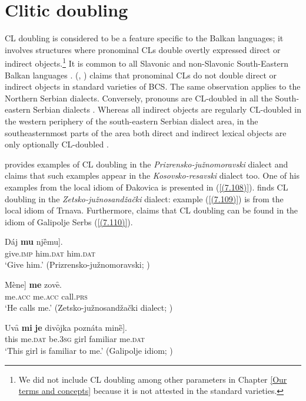 \section{Clitic doubling}
\label{Clitic doubling}
CL doubling is considered to be a feature specific to the Balkan languages; it involves structures where pronominal CLs double overtly expressed direct or indirect objects.\footnote{We did not include CL doubling among other parameters in Chapter \ref{Our terms and concepts} because it is not attested in the standard varieties.} It is common to all Slavonic and non-Slavonic South-Eastern Balkan languages \citep[114]{Stevanovic50}. \citeauthor{MiseskaTomic06} (\citeyear[239]{MiseskaTomic06}, \citeyear[426]{MiseskaTomic08}) claims that pronominal CLs do not double direct or indirect objects in standard varieties of BCS. The same observation applies to the Northern Serbian dialects. Conversely, pronouns are CL-doubled in all the South-eastern Serbian dialects \citep[463]{MiseskaTomic08}. Whereas all indirect objects are regularly CL-doubled in the western periphery of the south-eastern Serbian dialect area, in the southeasternmost parts of the area both direct and indirect lexical objects are only optionally CL-doubled \citep[463]{MiseskaTomic08}. 

\citet[113f]{Stevanovic50} provides examples of CL doubling in the \textit{Prizrensko-južnomoravski} dialect and claims that such examples appear in the \textit{Kosovsko-resavski} dialect too. One of his examples from the local idiom of Đakovica is presented in (\ref{(7.108)}). \citet[112]{Barjaktarevic66} finds CL doubling in the \textit{Zetsko-južno\-sandžač\-ki} dialect: example (\ref{(7.109)}) is from the local idiom of Trnava. Furthermore, \citet[356]{Ivic57} claims that CL doubling can be found in the idiom of Galipolje Serbs (\ref{(7.110)}). 

\begin{exe}\ex\label{(7.108)}
\gll Dáj 	\textbf{mu} 	\minsp{[} njȅmu]. \\
 give.\textsc{imp} 	him.\textsc{dat} {}	him.\textsc{dat}  \\
\glt ‘Give him.’
\hfill  (Prizrensko-južnomoravski; \citealt[113]{Stevanovic50})

\ex\label{(7.109)}
\gll \minsp{[} Mène] 	\textbf{me} 	 zovȇ. \\
 {} me.\textsc{acc} 	me.\textsc{acc} 	call.\textsc{prs}  \\
\glt ‘He calls me.’
\hfill  (Zetsko-južnosandžački dialect; \citealt[112]{Barjaktarevic66})

\ex\label{(7.110)}
\gll Uvȃ 	\textbf{mi} 	\textbf{je} 	divȏjka 	poznáta 	\minsp{[} minȅ]. \\
 this	me.\textsc{dat} 	be.3\textsc{sg} 	girl	familiar {} me.\textsc{dat}  \\
\glt 	‘This girl is familiar to me.’
\hfill  (Galipolje idiom; \citealt[356]{Ivic57})
\end{exe}

